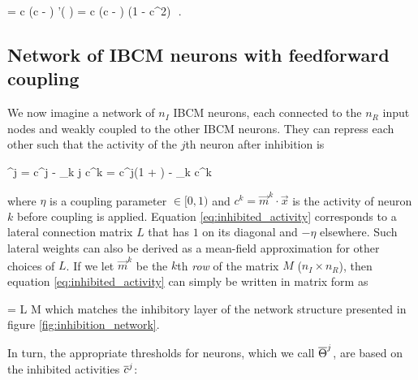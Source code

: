 \beq
	 = \mu c \left(c - \Theta \right)  \sigma'( \cdot {}) = \mu c \left(c - \Theta \right)  (1 - c^2) \,\,.
	\label{eq:ibcm_equation_nonlinear}
\eeq



\subsection{Network of IBCM neurons with feedforward coupling}
\label{subsect:ibcm_network}

We now imagine a network of $n_I$ IBCM neurons, each connected to the $n_R$ input nodes and weakly coupled to the other IBCM neurons. 
They can repress each other such that the activity of the $j$th neuron after inhibition is

\beq
	^j = c^j - \eta \sum_{k \neq j} c^k = c^j(1 + \eta) -  \eta \sum_k c^k 
	\label{eq:inhibited_activity}
\eeq

where $\eta$ is a coupling parameter $\in [0, 1)$ %
and $c^k = \vec{m}^k \cdot \vec{x}$ is the activity of neuron $k$ before coupling is applied. Equation \eqref{eq:inhibited_activity} corresponds to a lateral connection matrix $L$ that has $1$ on its diagonal and $-\eta$ elsewhere. 
Such lateral weights can also be derived as a mean-field approximation for other choices of $L$. If we let $\vec{m}^k$ be the $k$th \emph{row} of the matrix $M$ ($n_I \times n_R$), then equation \eqref{eq:inhibited_activity} can simply be written in matrix form as 

\beq
	= L M 
	\label{eq:inhibited_activity_matrix}
\eeq
which matches the inhibitory layer of the network structure presented in figure \ref{fig:inhibition_network}. 

In turn, the appropriate thresholds for neurons, which we call $\overline{\Theta}^j$, are based on the inhibited activities $\overline{c}^j$:

